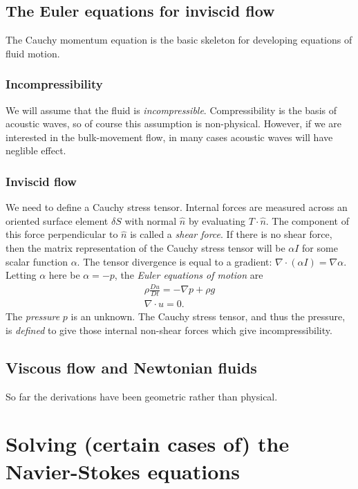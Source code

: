 \documentclass{article}
\begin{document}
\subsection{The Euler equations for inviscid flow} %
The Cauchy momentum equation is the basic skeleton for developing equations of fluid motion.

\subsubsection{Incompressibility}
We will assume that the fluid is \textit{incompressible}.
Compressibility is the basis of acoustic waves, so of course this assumption is non-physical. However, if we are interested in the bulk-movement flow,
in many cases acoustic waves will have neglible effect.

\subsubsection{Inviscid flow}
We need to define a Cauchy stress tensor. Internal forces are measured across an oriented surface element $\delta S$ with normal $\hat{n}$ by evaluating
$T\cdot \hat{n}$. The component of this force perpendicular to $\hat{n}$ is called a \textit{shear force}.
If there is no shear force, then the matrix representation of the Cauchy stress tensor will be $\alpha I$ for some scalar function $\alpha$.
The tensor divergence is equal to a gradient: $\nabla \cdot \left(\alpha I\right) = \nabla \alpha$. Letting $\alpha$ here be $\alpha = -p$,
the \textit{Euler equations of motion} are
\begin{equation}\label{Euler}
\begin{split}
    \rho \frac{Du}{Dt} = -\nabla p + \rho g \\
    \nabla \cdot u = 0.
\end{split}
\end{equation}
The \textit{pressure} $p$ is an unknown. The Cauchy stress tensor, and thus the pressure, is \textit{defined} to give those internal non-shear forces
which give incompressibility.
\subsection{Viscous flow and Newtonian fluids} %
So far the derivations have been geometric rather than physical.


\section{Solving (certain cases of) the Navier-Stokes equations}
\end{document}
